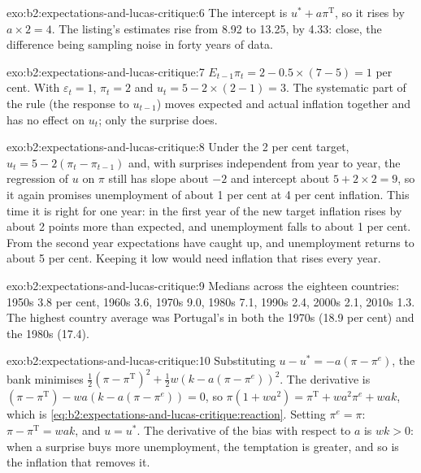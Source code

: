 \begin{solution}{exo:b2:expectations-and-lucas-critique:6}
The intercept is $u^* + a\pi^{\mathrm T}$, so it rises by $a \times 2 = 4$. The listing's estimates rise from 8.92 to 13.25, by 4.33: close, the difference
being sampling noise in forty years of data.
\end{solution}

\begin{solution}{exo:b2:expectations-and-lucas-critique:7}
$E_{t-1}\pi_t = 2 - 0.5 \times (7 - 5) = 1$ per cent. With $\varepsilon_t = 1$, $\pi_t = 2$ and $u_t = 5 - 2 \times (2 - 1) = 3$. The systematic part of the rule (the response to $u_{t-1}$) moves expected and actual
inflation together and has no effect on $u_t$; only the surprise does.
\end{solution}

\begin{solution}{exo:b2:expectations-and-lucas-critique:8}
Under the 2 per cent target, $u_t = 5 - 2(\pi_t - \pi_{t-1})$ and, with surprises independent from year to year, the regression of $u$ on $\pi$ still has slope about $-2$ and intercept
about $5 + 2 \times 2 = 9$, so it again promises unemployment of about 1 per cent at 4 per cent inflation. This time it is right for one
year: in the first year of the new target inflation rises by about 2 points more than expected, and unemployment falls to
about 1 per cent. From the second year expectations have caught up, and unemployment returns to about 5 per cent. Keeping it
low would need inflation that rises every year.
\end{solution}

\begin{solution}{exo:b2:expectations-and-lucas-critique:9}
Medians across the eighteen countries: 1950s 3.8 per cent, 1960s 3.6, 1970s 9.0, 1980s 7.1, 1990s 2.4, 2000s 2.1, 2010s 1.3. The highest country average was
Portugal's in both the 1970s (18.9 per cent) and the 1980s (17.4).
\end{solution}

\begin{solution}{exo:b2:expectations-and-lucas-critique:10}
Substituting $u - u^* = -a(\pi - \pi^e)$, the bank minimises $\tfrac12(\pi - \pi^{\mathrm T})^2 + \tfrac12w(k - a(\pi - \pi^e))^2$. The derivative is $(\pi - \pi^{\mathrm T}) - wa(k - a(\pi - \pi^e)) = 0$, so $\pi(1 + wa^2) = \pi^{\mathrm T} + wa^2\pi^e + wak$, which is \eqref{eq:b2:expectations-and-lucas-critique:reaction}.
Setting $\pi^e = \pi$: $\pi - \pi^{\mathrm T} = wak$, and $u = u^*$. The derivative of the bias with respect to $a$ is $wk > 0$: when a surprise buys more unemployment, the
temptation is greater, and so is the inflation that removes it.
\end{solution}

